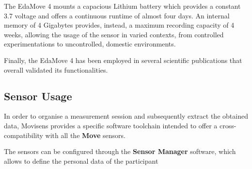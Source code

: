 The EdaMove 4 mounts a capacious Lithium battery which provides a constant 3.7 voltage and offers a continuous runtime of almost four days. An internal memory of 4 Gigabytes provides, instead, a maximum recording capacity of 4 weeks, allowing the usage of the sensor in varied contexts, from controlled experimentations to uncontrolled, domestic environments. 

Finally, the EdaMove 4 has been employed in several scientific publications that overall validated its functionalities.

\subsection{Sensor Usage}\label{subsec:edamove4-usage}

In order to organise a measurement session and subsequently extract the obtained data, Movisens provides a specific software toolchain intended to offer a cross-compatibility with all the \textbf{Move} sensors. 

The sensors can be configured through the \textbf{Sensor Manager} software, which allows to define the personal data of the participant



